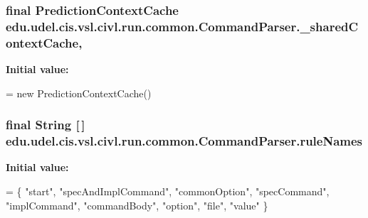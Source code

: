 \subsubsection[{\+\_\+shared\+Context\+Cache}]{\setlength{\rightskip}{0pt plus 5cm}final Prediction\+Context\+Cache edu.\+udel.\+cis.\+vsl.\+civl.\+run.\+common.\+Command\+Parser.\+\_\+shared\+Context\+Cache\hspace{0.3cm}{\ttfamily [static]}, {\ttfamily [protected]}}\label{classedu_1_1udel_1_1cis_1_1vsl_1_1civl_1_1run_1_1common_1_1CommandParser_ade6db86acf3fa8bd126ad251f030dca7}
{\bfseries Initial value\+:}
\begin{DoxyCode}
=
        \textcolor{keyword}{new} PredictionContextCache()
\end{DoxyCode}
\hypertarget{classedu_1_1udel_1_1cis_1_1vsl_1_1civl_1_1run_1_1common_1_1CommandParser_ab2ee25478b98a9045e38528c1893ee6b}{}
\subsubsection[{rule\+Names}]{\setlength{\rightskip}{0pt plus 5cm}final String \mbox{[}$\,$\mbox{]} edu.\+udel.\+cis.\+vsl.\+civl.\+run.\+common.\+Command\+Parser.\+rule\+Names\hspace{0.3cm}{\ttfamily [static]}}\label{classedu_1_1udel_1_1cis_1_1vsl_1_1civl_1_1run_1_1common_1_1CommandParser_ab2ee25478b98a9045e38528c1893ee6b}
{\bfseries Initial value\+:}
\begin{DoxyCode}
= \{
        \textcolor{stringliteral}{"start"}, \textcolor{stringliteral}{"specAndImplCommand"}, \textcolor{stringliteral}{"commonOption"}, \textcolor{stringliteral}{"specCommand"}, \textcolor{stringliteral}{"implCommand"}, 
        \textcolor{stringliteral}{"commandBody"}, \textcolor{stringliteral}{"option"}, \textcolor{stringliteral}{"file"}, \textcolor{stringliteral}{"value"}
    \}
\end{DoxyCode}
\hypertarget{classedu_1_1udel_1_1cis_1_1vsl_1_1civl_1_1run_1_1common_1_1CommandParser_acd6b4fe74d7c068f46686262b26dd91a}{}
